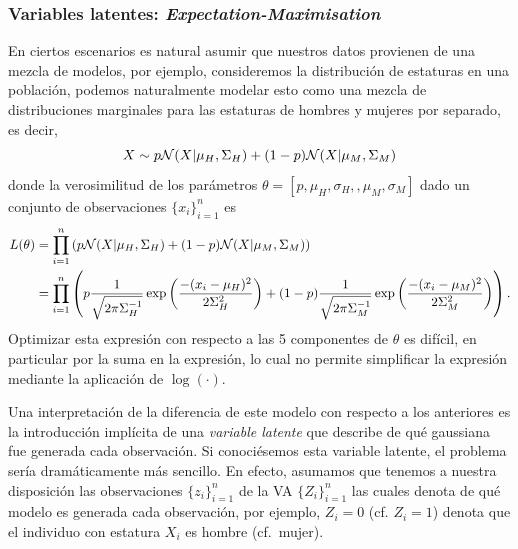 \subsubsection{Variables latentes: \textit{Expectation-Maximisation}} 
\label{sub:EM}

En ciertos escenarios es natural asumir que nuestros datos provienen de una mezcla de modelos, por ejemplo, consideremos la distribución de estaturas en una población, podemos naturalmente modelar esto como una mezcla de distribuciones marginales para las estaturas de hombres y mujeres por separado, es decir, 
\begin{equation}
	X\sim p{\mathcal N}(X|\mu_H,\Sigma_H) + (1-p){\mathcal N}(X|\mu_M,\Sigma_M)
\end{equation}
donde la verosimilitud de los parámetros $\theta = [p, \mu_H, \sigma_H,, \mu_M, \sigma_M]$ dado un conjunto de observaciones $\{x_i\}_{i=1}^n$ es
\begin{align*}
	L(\theta) 	&= \prod_{i=1}^n \left( p{\mathcal N}(X|\mu_H,\Sigma_H) + (1-p){\mathcal N}(X|\mu_M,\Sigma_M) \right)\\
				&= \prod_{i=1}^n \left( p\frac{1}{\sqrt{2\pi\Sigma_H^{-1}}}\exp\left(\frac{-(x_i-\mu_H)^2}{2\Sigma^2_H}\right) + (1-p)\frac{1}{\sqrt{2\pi\Sigma_M^{-1}}}\exp\left(\frac{-(x_i-\mu_M)^2}{2\Sigma^2_M}\right)\right).
\end{align*}
Optimizar esta expresión con respecto a las 5 componentes de $\theta$ es difícil, en particular por la suma en la expresión, lo cual no permite simplificar la expresión mediante la aplicación de $\log(\cdot)$. 

Una interpretación de la diferencia de este modelo con respecto a los anteriores es la introducción implícita de una  \textit{variable latente} que describe de qué gaussiana fue generada cada observación. Si conociésemos esta variable latente, el problema sería dramáticamente más sencillo. En efecto, asumamos que tenemos a nuestra disposición las observaciones $\{z_i\}_{i=1}^n$ de la VA $\{Z_i\}_{i=1}^n$ las cuales denota de qué modelo es generada cada observación, por ejemplo, $Z_i=0$ (cf. $Z_i=1$) denota que el individuo con estatura $X_i$ es hombre (cf.~mujer).
 
